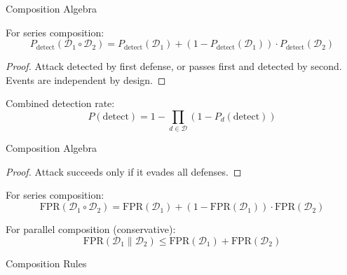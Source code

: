 \documentclass[
  ignorenonframetext,
]{beamer}
\begin{document}
\begin{frame}[allowframebreaks]{Composition Algebra}
\begin{theorem}
\label{thm:series-detection}
For series composition:
\begin{equation}
\label{eq:series-detection}
P_{\text{detect}}(\mathcal{D}_1 \circ \mathcal{D}_2) = P_{\text{detect}}(\mathcal{D}_1) + (1 - P_{\text{detect}}(\mathcal{D}_1)) \cdot P_{\text{detect}}(\mathcal{D}_2)
\end{equation}
\end{theorem}

\begin{proof}
Attack detected by first defense, or passes first and detected by second. Events are independent by design.
\end{proof}

\begin{theorem}
\label{thm:parallel-detection}
Combined detection rate:
\begin{equation}
\label{eq:parallel-detection}
P(\text{detect}) = 1 - \prod_{d \in \mathcal{D}} (1 - P_d(\text{detect}))
\end{equation}
\end{theorem}

\end{frame}

\begin{frame}[allowframebreaks]{Composition Algebra}
\begin{proof}
Attack succeeds only if it evades all defenses.
\end{proof}

\begin{theorem}
\label{thm:fpr-composition}
For series composition:
\begin{equation}
\label{eq:fpr-series}
\text{FPR}(\mathcal{D}_1 \circ \mathcal{D}_2) = \text{FPR}(\mathcal{D}_1) + (1 - \text{FPR}(\mathcal{D}_1)) \cdot \text{FPR}(\mathcal{D}_2)
\end{equation}

For parallel composition (conservative):
\begin{equation}
\label{eq:fpr-parallel}
\text{FPR}(\mathcal{D}_1 \parallel \mathcal{D}_2) \leq \text{FPR}(\mathcal{D}_1) + \text{FPR}(\mathcal{D}_2)
\end{equation}
\end{theorem}
\end{frame}

\begin{frame}[allowframebreaks]{Composition Rules}
\protect{}\label{composition-rules}
\end{frame}
\end{document}
